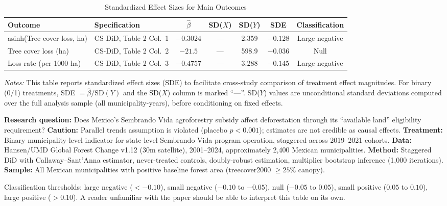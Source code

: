 \documentclass[12pt]{article}
\begin{document}
\begin{table}[H]
\centering
\caption{Standardized Effect Sizes for Main Outcomes}
\label{tab:sde}
\begin{adjustbox}{max width=\textwidth}
\begin{tabular}{llccccc}
\toprule
Outcome & Specification & $\hat{\beta}$ & SD($X$) & SD($Y$) & SDE & Classification \\
\midrule
asinh(Tree cover loss, ha) & CS-DiD, Table 2 Col.\ 1 & $-0.3024$ & --- & 2.359 & $-0.128$ & Large negative \\
Tree cover loss (ha) & CS-DiD, Table 2 Col.\ 2 & $-21.5$ & --- & 598.9 & $-0.036$ & Null \\
Loss rate (per 1000 ha) & CS-DiD, Table 2 Col.\ 3 & $-0.4757$ & --- & 3.288 & $-0.145$ & Large negative \\
\bottomrule
\end{tabular}
\end{adjustbox}
\par\vspace{0.3em}
{\footnotesize \emph{Notes:} This table reports standardized effect sizes (SDE) to facilitate cross-study comparison of treatment effect magnitudes. For binary (0/1) treatments, SDE $= \hat{\beta} / \text{SD}(Y)$ and the SD($X$) column is marked ``---''. SD($Y$) values are unconditional standard deviations computed over the full analysis sample (all municipality-years), before conditioning on fixed effects.

\textbf{Research question:} Does Mexico's Sembrando Vida agroforestry subsidy affect deforestation through its ``available land'' eligibility requirement? \textbf{Caution:} Parallel trends assumption is violated (placebo $p < 0.001$); estimates are not credible as causal effects.
\textbf{Treatment:} Binary municipality-level indicator for state-level Sembrando Vida program operation, staggered across 2019--2021 cohorts.
\textbf{Data:} Hansen/UMD Global Forest Change v1.12 (30m satellite), 2001--2024, approximately 2,400 Mexican municipalities.
\textbf{Method:} Staggered DiD with Callaway--Sant'Anna estimator, never-treated controls, doubly-robust estimation, multiplier bootstrap inference (1,000 iterations).
\textbf{Sample:} All Mexican municipalities with positive baseline forest area (treecover2000 $\geq 25\%$ canopy).

Classification thresholds: large negative ($< -0.10$), small negative ($-0.10$ to $-0.05$), null ($-0.05$ to $0.05$), small positive ($0.05$ to $0.10$), large positive ($> 0.10$). A reader unfamiliar with the paper should be able to interpret this table on its own.}
\end{table}
\end{document}
